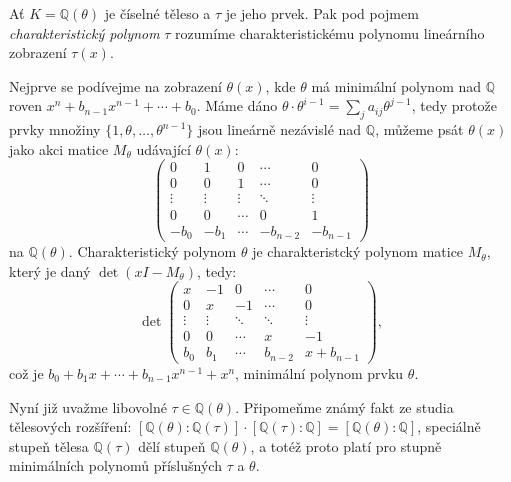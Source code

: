 \documentclass[12pt]{report}
\begin{document}
\begin{definice}
Ať $K = \mathbb{Q}(\theta)$ je číselné těleso a $\tau$ je jeho prvek. Pak pod pojmem \textit{charakteristický polynom} $\tau$ rozumíme charakteristickému polynomu lineárního zobrazení $\tau(x)$. 
\end{definice}

Nejprve se podívejme na zobrazení $\theta(x)$, kde $\theta$ má minimální polynom nad $\mathbb{Q}$ roven $x^n + b_{n-1} x^{n-1} + \cdots + b_0$. Máme dáno $\theta \cdot \theta^{i-1} = \sum_j a_{ij} \theta^{j-1}$, tedy protože prvky množiny $\lbrace 1,\theta,\dots,\theta^{n-1} \rbrace$ jsou lineárně nezávislé nad $\mathbb{Q}$, můžeme psát $\theta(x)$ jako akci matice $M_{\theta}$ udávající $\theta(x)$:
\begin{equation*}
 \begin{pmatrix}
0 & 1 & 0 & \cdots & 0\\
0 & 0 & 1 & \cdots & 0\\
\vdots & \vdots & \vdots & \ddots &\vdots\\
0 & 0 & \cdots & 0& 1\\
-b_0 & -b_1 & \cdots & -b_{n-2} & -b_{n-1}
\end{pmatrix} 
\end{equation*}
na $\mathbb{Q}(\theta)$. Charakteristický polynom $\theta$ je charakteristcký polynom matice $M_\theta$, který je daný $\det (x I - M_{\theta})$,  tedy:
\begin{equation*}
 \det \begin{pmatrix}
x & -1 & 0 & \cdots & 0\\
0 & x & -1 & \cdots & 0\\
\vdots & \vdots & \ddots & \ddots &\vdots\\
0 & 0 & \cdots & x& -1\\
b_0 & b_1 & \cdots & b_{n-2} & x +b_{n-1}
\end{pmatrix} ,
\end{equation*}
což je $b_0 + b_1 x + \cdots + b_{n-1} x^{n-1} + x^n$, minimální polynom prvku $\theta$.

Nyní již uvažme libovolné $ \tau \in \mathbb{Q}(\theta)$. Připomeňme známý fakt ze studia tělesových rozšíření: $[\mathbb{Q}(\theta) : \mathbb{Q}(\tau)] \cdot [\mathbb{Q}(\tau) : \mathbb{Q}] = [\mathbb{Q}(\theta) : \mathbb{Q}]$, speciálně stupeň tělesa $\mathbb{Q}(\tau)$ dělí stupeň $\mathbb{Q}(\theta)$, a totéž proto platí pro stupně minimálních polynomů příslušných $\tau$ a $\theta$.
\end{document}
